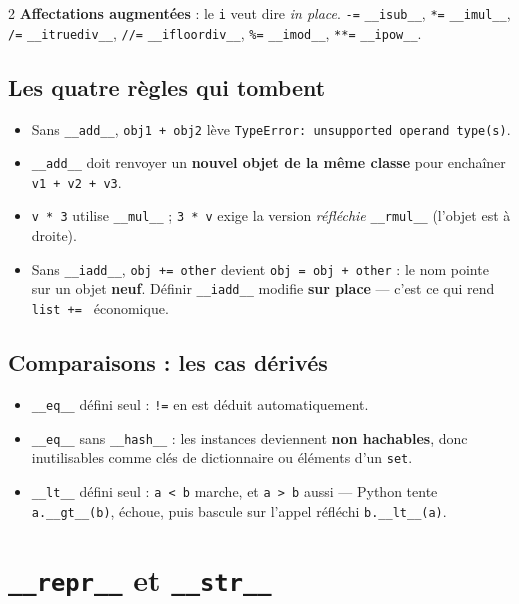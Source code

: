 \documentclass[a4paper,10pt]{article}
\newcommand{\co}[1]{\texttt{\textcolor{codefg}{#1}}}
\begin{document}
\begin{multicols}{2}
\vspace{0.5em}
\textbf{Affectations augmentées} : le \co{i} veut dire \emph{in place}.
\co{-=} \co{\_\_isub\_\_}, \co{*=} \co{\_\_imul\_\_}, \co{/=}
\co{\_\_itruediv\_\_}, \co{//=} \co{\_\_ifloordiv\_\_}, \co{\%=}
\co{\_\_imod\_\_}, \co{**=} \co{\_\_ipow\_\_}.

\subsection{Les quatre règles qui tombent}
\begin{itemize}
  \item Sans \co{\_\_add\_\_}, \co{obj1 + obj2} lève
        \co{TypeError: unsupported operand type(s)}.
  \item \co{\_\_add\_\_} doit renvoyer un \textbf{nouvel objet de la même
        classe} pour enchaîner \co{v1 + v2 + v3}.
  \item \co{v * 3} utilise \co{\_\_mul\_\_} ; \co{3 * v} exige la version
        \emph{réfléchie} \co{\_\_rmul\_\_} (l'objet est à droite).
  \item Sans \co{\_\_iadd\_\_}, \co{obj += other} devient
        \co{obj = obj + other} : le nom pointe sur un objet \textbf{neuf}.
        Définir \co{\_\_iadd\_\_} modifie \textbf{sur place} --- c'est ce
        qui rend \co{list += } économique.
\end{itemize}

\subsection{Comparaisons : les cas dérivés}
\begin{itemize}
  \item \co{\_\_eq\_\_} défini seul : \co{!=} en est déduit automatiquement.
  \item \co{\_\_eq\_\_} sans \co{\_\_hash\_\_} : les instances deviennent
        \textbf{non hachables}, donc inutilisables comme clés de
        dictionnaire ou éléments d'un \co{set}.
  \item \co{\_\_lt\_\_} défini seul : \co{a < b} marche, et \co{a > b}
        aussi --- Python tente \co{a.\_\_gt\_\_(b)}, échoue, puis bascule
        sur l'appel réfléchi \co{b.\_\_lt\_\_(a)}.
\end{itemize}

\section{\co{\_\_repr\_\_} et \co{\_\_str\_\_}}


\end{multicols}
\end{document}
